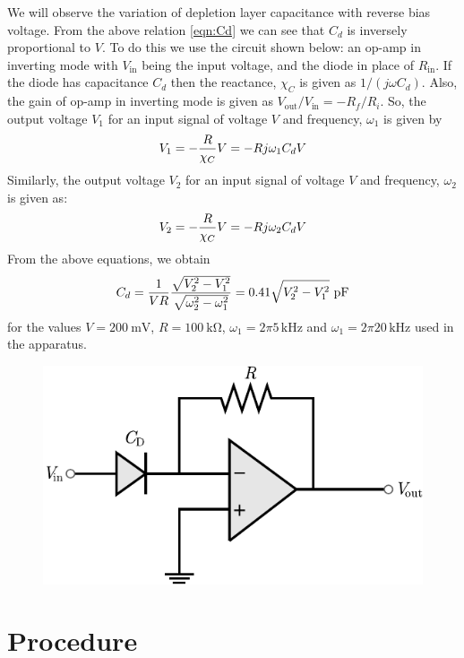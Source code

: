 	We will observe the variation of depletion layer capacitance with reverse bias voltage. From the above relation \ref{eqn:Cd} we can see that $ C_d $ is inversely proportional to $ V $. To do this we use the circuit shown below: an op-amp in inverting mode with $ V_{\mathrm{in}} $ being the input voltage, and the diode in place of $ R_{\mathrm{in}} $. If the diode has capacitance $ C_d $ then the reactance, $ \chi_C $ is given as $ 1/(j\omega C_d) $. Also, the gain of op-amp in inverting mode is given as $ V_{\mathrm{out}}/V_{\mathrm{in}} = -R_f/R_i$. So, the output voltage $ V_1 $ for an input signal of voltage $ V $ and frequency, $ \omega_1 $ is given by
	\begin{equation}{\label{eqn:V1}}
		V_1 = -\dfrac{R}{\chi_C}V = -Rj \omega_1 C_d V
	\end{equation}
	Similarly, the output voltage $ V_2 $ for an input signal of voltage $ V $ and frequency, $ \omega_2 $ is given as:
	\begin{equation}{\label{eqn:V2}}
		V_2 = -\dfrac{R}{\chi_C}V = -Rj \omega_2 C_d V
	\end{equation}
	From the above equations, we obtain
	\begin{equation}{\label{eqn:Cd-final}}
		C_d = \dfrac{1}{VR}\dfrac{\sqrt{V_2^2 - V_1^2}}{\sqrt{\omega_2^2 - \omega_1^2}} = 0.41\sqrt{V_2^2 - V_1^2} \ \text{\si{\pico\farad}}
	\end{equation}
	for the values $ V = \SI{200}{\milli\volt} $, $ R = \SI{100}{\kilo\ohm} $, $ \omega_1 = 2 \pi 5\,\si{\kilo\hertz} $ and $ \omega_1 = 2 \pi 20\,\si{\kilo\hertz} $ used in the apparatus.
	\begin{figure}
		\centering
		\includegraphics{Experiments/sem12-pn-circuit.pdf}
	\end{figure}
	
\section{Procedure}

